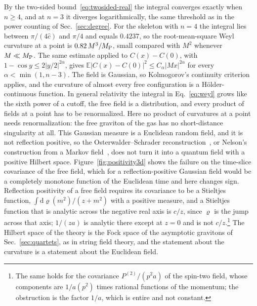 \documentclass[aps,prd,10pt,twocolumn,superscriptaddress,nofootinbib,floatfix,longbibliography]{revtex4-2}
\newcommand{\bE}{\mathbb{E}}
\newcommand{\dd}{\mathrm{d}}
\newcommand{\Pt}{P^{(2)}}
\begin{document}
By the two-sided bound~\eqref{eq:twosided-real} the integral converges exactly when $n\ge4$, and at $n=3$ it diverges logarithmically, the same threshold as in the power counting of Sec.~\ref{sec:degree}. For the skeleton with $n=4$ the integral lies between $\pi/(4\hat c)$ and $\pi/4$ and equals $0.4237$, so the root-mean-square Weyl curvature at a point is $0.82\,M^3/M_{\rm P}$, small compared with $M^2$ whenever $M\ll M_{\rm P}$. The same estimate applied to $C(x)-C(0)$, with $1-\cos y\le2|y/2|^{2\alpha}$, gives $\bE|C(x)-C(0)|^2\le C_\alpha|Mx|^{2\alpha}$ for every $\alpha<\min(1,n-3)$. The field is Gaussian, so Kolmogorov's continuity criterion applies, and the curvature of almost every free configuration is a H\"older-continuous function. In general relativity the integral in Eq.~\eqref{eq:weyl} grows like the sixth power of a cutoff, the free field is a distribution, and every product of fields at a point has to be renormalized. Here no product of curvatures at a point needs renormalization: the free graviton of the gas has no short-distance singularity at all. This Gaussian measure is a Euclidean random field, and it is not reflection positive, so the Osterwalder--Schrader reconstruction~\cite{OsterwalderSchrader1973,OsterwalderSchrader1975,GlimmJaffe1987}, or Nelson's construction from a Markov field~\cite{Nelson1973}, does not turn it into a quantum field with a positive Hilbert space. Figure~\ref{fig:positivity3d} shows the failure on the time-slice covariance of the free field, which for a reflection-positive Gaussian field would be a completely monotone function of the Euclidean time and here changes sign. Reflection positivity of a free field requires its covariance to be a Stieltjes function, $\int\dd\varrho(m^2)/(z+m^2)$ with a positive measure, and a Stieltjes function that is analytic across the negative real axis is $c/z$, since $\varrho$ is the jump across that axis; $1/(za)$ is analytic there except at $z=0$ and is not $c/z$.\footnote{The same holds for the covariance $\Pt/(p^2a)$ of the spin-two field, whose components are $1/a(p^2)$ times rational functions of the momentum; the obstruction is the factor $1/a$, which is entire and not constant.} The Hilbert space of the theory is the Fock space of the asymptotic gravitons of Sec.~\ref{sec:quartets}, as in string field theory, and the statement about the curvature is a statement about the Euclidean field.
\end{document}
